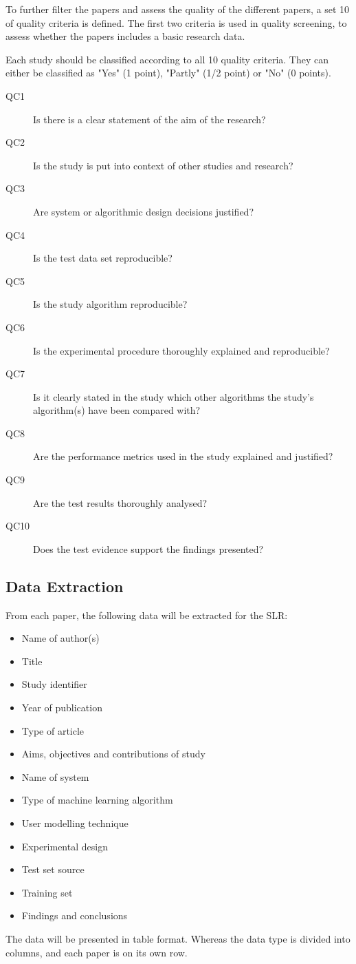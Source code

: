 To further filter the papers and assess the quality of the different papers, a set 10 of quality criteria is defined. The first two criteria is used in quality screening, to assess whether the papers includes a basic research data.

Each study should be classified according to all 10 quality criteria. They can either be classified as "Yes" (1 point), "Partly" (1/2 point) or "No" (0 points).

\begin{description}

\item[QC1] Is there is a clear statement of the aim of the research?
\item[QC2] Is the study is put into context of other studies and research?
\item[QC3] Are system or algorithmic design decisions justified?
\item[QC4] Is the test data set reproducible?
\item[QC5] Is the study algorithm reproducible?
\item[QC6] Is the experimental procedure thoroughly explained and reproducible?
\item[QC7] Is it clearly stated in the study which other algorithms the study's algorithm(s) have been compared with?
\item[QC8] Are the performance metrics used in the study explained and justified?
\item[QC9] Are the test results thoroughly analysed?
\item[QC10] Does the test evidence support the findings presented?

\end{description}

\subsection{Data Extraction}

From each paper, the following data will be extracted for the SLR:

\begin{itemize}

\item Name of author(s) 
\item Title
\item Study identifier
\item Year of publication 
\item Type of article
\item Aims, objectives and contributions of study
\item Name of system
\item Type of machine learning algorithm
\item User modelling technique
\item Experimental design
\item Test set source
\item Training set
\item Findings and conclusions

\end{itemize}

The data will be presented in table format. Whereas the data type is divided into columns, and each paper is on its own row.